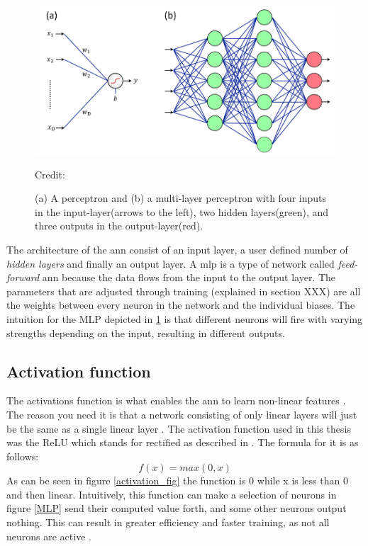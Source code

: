             \begin{figure}[H]
                \centering
                \includegraphics[scale=0.5]{figures/perceptron.png}
                \caption[The perceptron and multi-layer perceptron]{(a) A perceptron and (b) a multi-layer perceptron with four inputs in the input-layer(arrows to the left), two hidden layers(green), and three outputs in the output-layer(red).}
              	\medskip 
                \hspace*{15pt}\hbox{\scriptsize Credit: \citeauthor{razavi2021deep_exp_DL}\cite{razavi2021deep_exp_DL}}
                \label{Perceptron / MLP}
            \end{figure}
        
        The architecture of the \gls{ann} consist of an input layer, a user defined number of \textit{hidden layers} and finally an output layer. A \gls{mlp} is a type of network called \textit{feed-forward} \gls{ann} because the data flows from the input to the output layer. The parameters that are adjusted through training (explained in section XXX) are all the weights between every neuron in the network and the individual biases. The intuition for the MLP depicted in \ref{Perceptron / MLP} is that different neurons will fire with varying strengths depending on the input, resulting in different outputs.
        
    \subsection{Activation function} \label{activation function}
        The activations function is what enables the \gls{ann} to learn non-linear features \cite{razavi2021deep_exp_per}. The reason you need it is that a network consisting of only linear layers will just be the same as a single linear layer \cite{razavi2021deep_exp_per}. The activation function used in this thesis was the ReLU which stands for rectified as described in \cite{sharma2019new_activation_func}. The formula for it is as follows:
            \begin{equation} \label{relu_eq}
                f(x) = max(0,x)
            \end{equation}
        As can be seen in figure \ref{activation_fig} the function is 0 while x is less than 0 and then linear. Intuitively, this function can make a selection of neurons in figure \ref{MLP} send their computed value forth, and some  other neurons output nothing. This can result in greater efficiency and faster training, as not all neurons are active \cite{sharma2019new_activation_func}.
        
